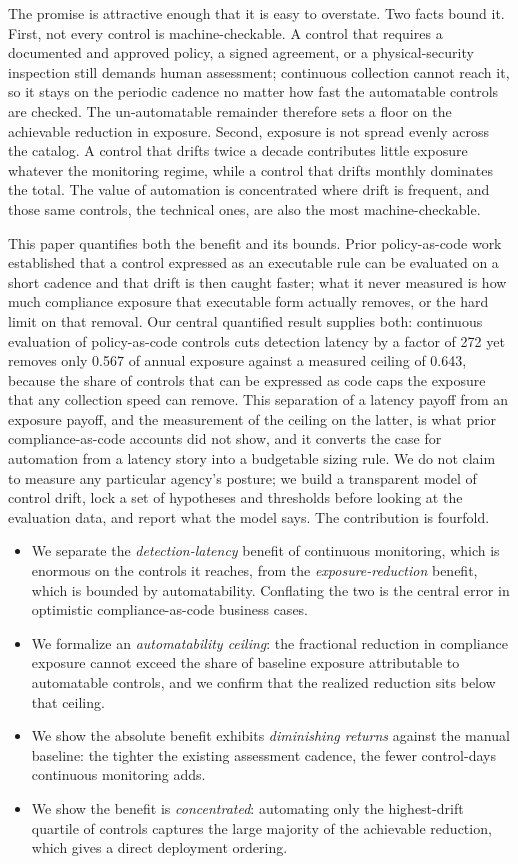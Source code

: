 \documentclass[journal]{IEEEtran}
\begin{document}
The promise is attractive enough that it is easy to overstate. Two facts bound it. First, not
every control is machine-checkable. A control that requires a documented and approved policy, a
signed agreement, or a physical-security inspection still demands human assessment; continuous
collection cannot reach it, so it stays on the periodic cadence no matter how fast the automatable
controls are checked. The un-automatable remainder therefore sets a floor on the achievable
reduction in exposure. Second, exposure is not spread evenly across the catalog. A control that
drifts twice a decade contributes little exposure whatever the monitoring regime, while a control
that drifts monthly dominates the total. The value of automation is concentrated where drift is
frequent, and those same controls, the technical ones, are also the most machine-checkable.

This paper quantifies both the benefit and its bounds. Prior policy-as-code work established that a
control expressed as an executable rule can be evaluated on a short cadence and that drift is then
caught faster; what it never measured is how much compliance exposure that executable form actually
removes, or the hard limit on that removal. Our central quantified result supplies both: continuous
evaluation of policy-as-code controls cuts detection latency by a factor of 272 yet removes only
0.567 of annual exposure against a measured ceiling of 0.643, because the share of controls that can
be expressed as code caps the exposure that any collection speed can remove. This separation of a
latency payoff from an exposure payoff, and the measurement of the ceiling on the latter, is what
prior compliance-as-code accounts did not show, and it converts the case for automation from a
latency story into a budgetable sizing rule. We do not claim to measure any particular
agency's posture; we build a transparent model of control drift, lock a set of hypotheses and
thresholds before looking at the evaluation data, and report what the model says. The contribution
is fourfold.

\begin{itemize}
\item We separate the \emph{detection-latency} benefit of continuous monitoring, which is enormous
on the controls it reaches, from the \emph{exposure-reduction} benefit, which is bounded by
automatability. Conflating the two is the central error in optimistic compliance-as-code business
cases.
\item We formalize an \emph{automatability ceiling}: the fractional reduction in compliance
exposure cannot exceed the share of baseline exposure attributable to automatable controls, and we
confirm that the realized reduction sits below that ceiling.
\item We show the absolute benefit exhibits \emph{diminishing returns} against the manual baseline:
the tighter the existing assessment cadence, the fewer control-days continuous monitoring adds.
\item We show the benefit is \emph{concentrated}: automating only the highest-drift quartile of
controls captures the large majority of the achievable reduction, which gives a direct deployment
ordering.
\end{itemize}
\end{document}
